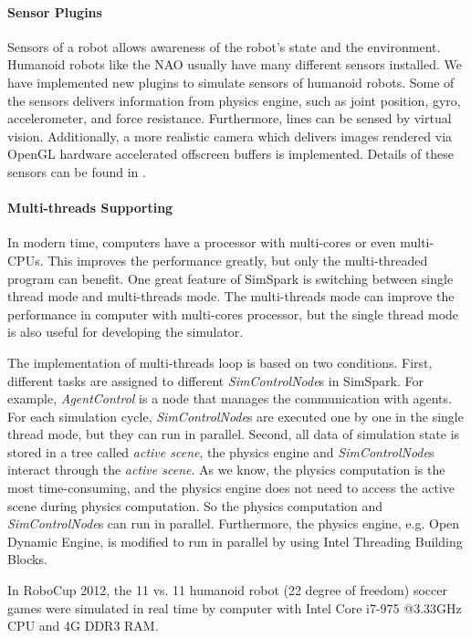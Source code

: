 \documentclass{llncs}
\begin{document}
\paragraph{Sensor Plugins}
Sensors of a robot allows awareness of the robot's state and the environment.
Humanoid robots like the NAO usually have many different sensors installed.
We have implemented new plugins to simulate sensors of humanoid robots.
Some of the sensors delivers information from physics engine, such as joint position, gyro, accelerometer, and force resistance. Furthermore, lines can be sensed by virtual vision.
Additionally, a more realistic camera which delivers images rendered via OpenGL hardware accelerated offscreen buffers is implemented. Details of these sensors can be found in \cite{usermanual}.

\paragraph{Multi-threads Supporting}
In modern time, computers have a processor with multi-cores or even multi-CPUs.
This improves the performance greatly, but only the multi-threaded program can benefit.
One great feature of SimSpark is switching between single thread mode and multi-threads
mode. The multi-threads mode can improve the performance in computer with multi-cores processor, but the single thread mode is also useful for developing the simulator. 

The implementation of multi-threads loop is based on two conditions.
First, different tasks are assigned to different \textit{SimControlNode}s in SimSpark.
For example, \textit{AgentControl} is a node that manages the communication with agents.
For each simulation cycle, \textit{SimControlNode}s are executed one by one in the single thread mode, but they can run in parallel.
Second, all data of simulation state is stored in a tree called \textit{active scene},
the physics engine and \textit{SimControlNode}s interact through the \textit{active scene}.
As we know, the physics computation is the most time-consuming, and the physics engine does not need to access the active scene during physics computation.
So the physics computation and \textit{SimControlNode}s can run in parallel.
Furthermore, the physics engine, e.g. Open Dynamic Engine\cite{Smith:ODE}, is modified to run in parallel by using Intel Threading Building Blocks\cite{tbb}.

In RoboCup 2012, the 11 vs. 11 humanoid robot (22 degree of freedom) soccer games were simulated in real time by computer with Intel Core i7-975 @3.33GHz CPU and 4G DDR3 RAM. 
\end{document}
